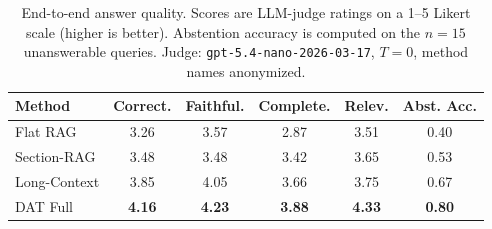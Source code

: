 \begin{table}[t]
\centering
\caption{End-to-end answer quality. Scores are LLM-judge ratings on a 1--5 Likert scale (higher is better). Abstention accuracy is computed on the $n=15$ unanswerable queries. Judge: \texttt{gpt-5.4-nano-2026-03-17}, $T{=}0$, method names anonymized.}
\label{tab:answer_quality}
\begin{tabular}{lccccc}
\toprule
\textbf{Method} & \textbf{Correct.} & \textbf{Faithful.} & \textbf{Complete.} & \textbf{Relev.} & \textbf{Abst. Acc.} \\
\midrule
Flat RAG & 3.26 & 3.57 & 2.87 & 3.51 & 0.40 \\
Section-RAG & 3.48 & 3.48 & 3.42 & 3.65 & 0.53 \\
Long-Context & 3.85 & 4.05 & 3.66 & 3.75 & 0.67 \\
DAT Full & \textbf{4.16} & \textbf{4.23} & \textbf{3.88} & \textbf{4.33} & \textbf{0.80} \\
\bottomrule
\end{tabular}
\end{table}
